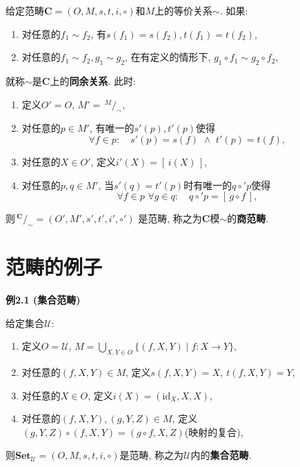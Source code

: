 \documentclass[UTF8]{ctexart}
\begin{document}
给定范畴$\mathbf{C}=(O,M,s,t,i,\circ)$和$M$上的等价关系$\sim$. 如果:
\begin{enumerate}
    \item 对任意的$f_1\sim f_2$, 有$s(f_1)=s(f_2),t(f_1)=t(f_2)$,
    \item 对任意的$f_1\sim f_2,g_1\sim g_2$, 在有定义的情形下,
    $g_1\circ f_1\sim g_2\circ f_2$,
\end{enumerate}
就称$\sim$是$\mathbf{C}$上的\textbf{同余关系}. 此时:
\begin{enumerate}
    \vspace{3pt}
    \item 定义$O'=O$, $M'=\,\!^{\displaystyle M}\!/_{\displaystyle\sim}$,
    \item 对任意的$p\in M'$, 有唯一的$s'(p),t'(p)$使得
    \[
        \forall f\in p:\quad s'(p)=s(f)\,\,\land\,\,t'(p)=t(f),
    \]
    \item 对任意的$X\in O'$, 定义$i'(X)=[\,i(X)\,]$,
    \item 对任意的$p,q\in M'$, 当$s'(q)=t'(p)$时有唯一的$q\circ'p$使得
    \[
        \forall f\in p\,\,\forall g\in q:\quad q\circ'p=[\,g\circ f\,],
    \]
\end{enumerate}
则$\,\!^{\displaystyle\mathbf{C}}\!/_{\displaystyle\sim}=(O',M',s',t',i',\circ')$
是范畴, 称之为$\mathbf{C}$模$\sim$的\textbf{商范畴}.





\newpage

\section{范畴的例子}

\hypertarget{sec:例2.1}{}
\noindent\textbf{例2.1 (集合范畴)}

给定集合$\mathcal{U}$:
\begin{enumerate}
    \item 定义$O=\mathcal{U}$,
    $\displaystyle M=\bigcup_{X,Y\in O}\{(f,X,Y)\mid f:X\to Y\}$,
    \vspace{3pt}
    \item 对任意的$(f,X,Y)\in M$, 定义$s(f,X,Y)=X,\ t(f,X,Y)=Y$,
    \item 对任意的$X\in O$, 定义$i(X)=(\mathrm{id}_X,X,X)$,
    \item 对任意的$(f,X,Y),(g,Y,Z)\in M$,
    定义$(g,Y,Z)\circ(f,X,Y)=(g\circ f,X,Z)$(映射的复合),
\end{enumerate}
则$\mathbf{Set}_{\mathcal{U}}=(O,M,s,t,i,\circ)$是范畴,
称之为$\mathcal{U}$内的\textbf{集合范畴}.
\end{document}
